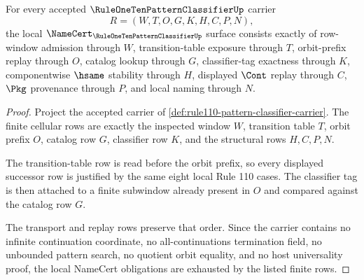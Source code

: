 \begin{theorem}
\label{thm:rule110-pattern-classifier-namecert-obligations}
For every accepted $\RuleOneTenPatternClassifierUp$ carrier
$$
R=(W,T,O,G,K,H,C,P,N),
$$
the local $\NameCert_{\RuleOneTenPatternClassifierUp}$ surface consists exactly of row-window admission through $W$, transition-table exposure through $T$, orbit-prefix replay through $O$, catalog lookup through $G$, classifier-tag exactness through $K$, componentwise $\hsame$ stability through $H$, displayed $\Cont$ replay through $C$, $\Pkg$ provenance through $P$, and local naming through $N$.
\end{theorem}
\begin{proof}
Project the accepted carrier of \autoref{def:rule110-pattern-classifier-carrier}. The finite cellular rows are exactly the inspected window $W$, transition table $T$, orbit prefix $O$, catalog row $G$, classifier row $K$, and the structural rows $H,C,P,N$.

The transition-table row is read before the orbit prefix, so every displayed successor row is justified by the same eight local Rule 110 cases. The classifier tag is then attached to a finite subwindow already present in $O$ and compared against the catalog row $G$.

The transport and replay rows preserve that order. Since the carrier contains no infinite continuation coordinate, no all-continuations termination field, no unbounded pattern search, no quotient orbit equality, and no host universality proof, the local NameCert obligations are exhausted by the listed finite rows.
\end{proof}



